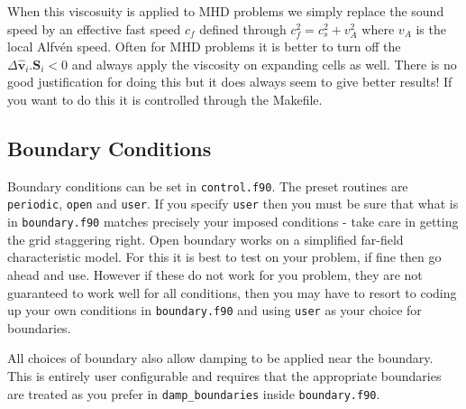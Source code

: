 \documentclass[11pt]{article}
\begin{document}
When this viscosuity is applied to MHD problems we simply replace the sound speed by an effective fast speed $c_f$
defined through $c_f^2=c_s^2 + v_A^2$ where $v_A$ is the local Alfv\'en speed. Often for MHD problems it is
better to turn off the $\Delta \hat{\mathbf{v}}_i . \mathbf{S}_i<0$ and always apply the viscosity on expanding
cells as well. There is no good justification for doing this but it does always seem to give better results!
If you want to do this it is controlled through the Makefile.

\subsection{Boundary Conditions}
Boundary conditions can be set in {\tt control.f90}. The preset routines are {\tt periodic}, 
{\tt open} and {\tt user}. If you specify {\tt user} then you must be sure that what is in {\tt boundary.f90} matches precisely your imposed conditions - take care in getting the grid staggering right. Open boundary works on a simplified far-field characteristic model. For this it is best to test on your problem, if fine then go ahead and use. However if these do not work for you problem, they are not guaranteed to work well for all conditions, then you may have to resort to coding up your own conditions in {\tt boundary.f90} and using {\tt user} as your choice for boundaries.

All choices of boundary also allow damping to be applied near the boundary. This is entirely user configurable and requires that the appropriate boundaries are treated as you prefer in {\tt damp\_boundaries} inside {\tt boundary.f90}.
\end{document}
